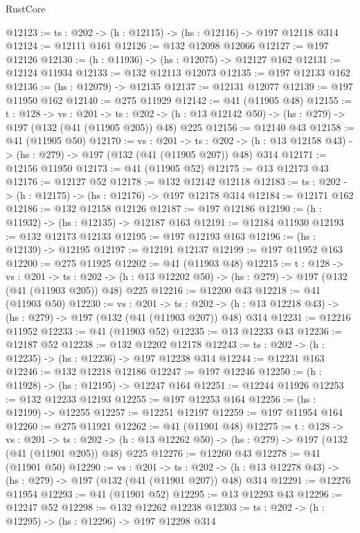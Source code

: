 \begin{lexlean}{RustCore}
\begin{coremodule}
@12123 := {ts : @202} -> (h : @12115) -> (hs : @12116) -> @197 @12118 @314
@12124 := @12111 @161
@12126 := @132 @12098 @12066
@12127 := @197 @12126
@12130 := (h : @11936) -> (hs : @12075) -> @12127 @162
@12131 := @12124 @11934
@12133 := @132 @12113 @12073
@12135 := @197 @12133 @162
@12136 := (hs : @12079) -> @12135
@12137 := @12131 @12077
@12139 := @197 @11950 @162
@12140 := @275 @11929
@12142 := @41 (@11905 @48)
@12155 := {t : @128} ->
  {vs : @201} ->
  {ts : @202} -> (h : @13 @12142 @50) -> (hs : @279) -> @197 (@132 (@41 (@11905 @205)) @48) @225
@12156 := @12140 @43
@12158 := @41 (@11905 @50)
@12170 := {vs : @201} ->
  {ts : @202} -> (h : @13 @12158 @43) -> (hs : @279) -> @197 (@132 (@41 (@11905 @207)) @48) @314
@12171 := @12156 @11950
@12173 := @41 (@11905 @52)
@12175 := @13 @12173 @43
@12176 := @12127 @52
@12178 := @132 @12142 @12118
@12183 := {ts : @202} -> (h : @12175) -> (hs : @12176) -> @197 @12178 @314
@12184 := @12171 @162
@12186 := @132 @12158 @12126
@12187 := @197 @12186
@12190 := (h : @11932) -> (hs : @12135) -> @12187 @163
@12191 := @12184 @11930
@12193 := @132 @12173 @12133
@12195 := @197 @12193 @163
@12196 := (hs : @12139) -> @12195
@12197 := @12191 @12137
@12199 := @197 @11952 @163
@12200 := @275 @11925
@12202 := @41 (@11903 @48)
@12215 := {t : @128} ->
  {vs : @201} ->
  {ts : @202} -> (h : @13 @12202 @50) -> (hs : @279) -> @197 (@132 (@41 (@11903 @205)) @48) @225
@12216 := @12200 @43
@12218 := @41 (@11903 @50)
@12230 := {vs : @201} ->
  {ts : @202} -> (h : @13 @12218 @43) -> (hs : @279) -> @197 (@132 (@41 (@11903 @207)) @48) @314
@12231 := @12216 @11952
@12233 := @41 (@11903 @52)
@12235 := @13 @12233 @43
@12236 := @12187 @52
@12238 := @132 @12202 @12178
@12243 := {ts : @202} -> (h : @12235) -> (hs : @12236) -> @197 @12238 @314
@12244 := @12231 @163
@12246 := @132 @12218 @12186
@12247 := @197 @12246
@12250 := (h : @11928) -> (hs : @12195) -> @12247 @164
@12251 := @12244 @11926
@12253 := @132 @12233 @12193
@12255 := @197 @12253 @164
@12256 := (hs : @12199) -> @12255
@12257 := @12251 @12197
@12259 := @197 @11954 @164
@12260 := @275 @11921
@12262 := @41 (@11901 @48)
@12275 := {t : @128} ->
  {vs : @201} ->
  {ts : @202} -> (h : @13 @12262 @50) -> (hs : @279) -> @197 (@132 (@41 (@11901 @205)) @48) @225
@12276 := @12260 @43
@12278 := @41 (@11901 @50)
@12290 := {vs : @201} ->
  {ts : @202} -> (h : @13 @12278 @43) -> (hs : @279) -> @197 (@132 (@41 (@11901 @207)) @48) @314
@12291 := @12276 @11954
@12293 := @41 (@11901 @52)
@12295 := @13 @12293 @43
@12296 := @12247 @52
@12298 := @132 @12262 @12238
@12303 := {ts : @202} -> (h : @12295) -> (hs : @12296) -> @197 @12298 @314

\end{coremodule}
\end{lexlean}
